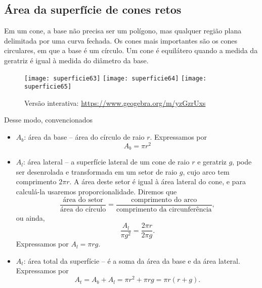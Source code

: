 \subsection{ Área da superfície de cones retos}

Em um cone, a base não precisa ser um polígono, mas qualquer região plana delimitada por uma curva fechada. Os cones mais importantes são os cones circulares, em que a base é um círculo. Um cone é equilátero quando a medida da geratriz é igual à medida do diâmetro da base.

\begin{figure}[H]
\centering

{\texttt{[image: superficie63]}\hspace{.5em}
\texttt{[image: superficie64]}\hspace{.5em}
\texttt{[image: superficie65]}}

\caption{Versão interativa: \url{https://www.geogebra.org/m/yzGzrUxs}}
\end{figure}

Desse modo, convencionados

\begin{itemize}
  \item $A_b$: área da base -- área do círculo de raio $r$. Expressamos por
  \begin{equation*}
  A_b=\pi r^2
  \end{equation*}  
  \item $A_l$: área lateral -- a superfície lateral de um cone de raio $r$ e geratriz $g$, pode ser desenrolada e transformada em um setor de raio $g$, cujo arco tem comprimento $2\pi r$. A área deste setor é igual à área lateral do cone, e para calculá-la usaremos proporcionalidade. Diremos que
  \begin{equation*}
  \frac{\text{área do setor}}{\text{área do círculo}}=\frac{\text{comprimento do arco}}{\text{comprimento da circunferência}},
  \end{equation*}
  ou ainda,
  \begin{equation*}
  \frac{A_l}{\pi g^2}=\frac{2\pi r}{2\pi g}.
  \end{equation*}
  Expressamos por $A_l=\pi rg$.
  \item $A_t$: área total da superfície -- é a soma da área da base e da área lateral. Expressamos por
  \begin{equation*}
  A_t=A_b+A_l=\pi r^2+\pi rg=\pi r(r+g).  
  \end{equation*}
\end{itemize}

